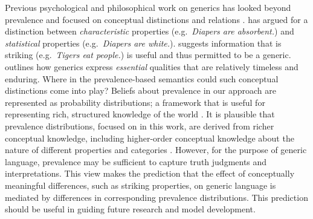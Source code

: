 \documentclass[10pt,letterpaper]{article}
\begin{document}
Previous psychological and philosophical work on generics has looked beyond prevalence and focused on conceptual distinctions and relations \cite{Gelman2005, Prasada2013, Leslie2007, Leslie2008}. 
\citeauthor{Prasada2013} has argued for a distinction between \emph{characteristic} properties (e.g.~\emph{Diapers are absorbent.}) and \emph{statistical} properties (e.g.~\emph{Diapers are white.}).
\citeauthor{Leslie2007} suggests information that is striking (e.g.~\emph{Tigers eat people.}) is useful and thus permitted to be a generic.
\citeauthor{Gelman2005} outlines how generics express \emph{essential} qualities that are relatively timeless and enduring. %
Where in the prevalence-based semantics could such conceptual distinctions come into play?
Beliefs about prevalence in our approach are represented as probability distributions; a framework that is useful for representing rich, structured knowledge of the world \cite{Goodmanconcepts}. 
It is plausible that prevalence distributions, focused on in this work, are derived from richer conceptual knowledge, including higher-order conceptual knowledge about the nature of different properties and categories \cite{Gelman2005, Keil1992}. 
However, for the purpose of generic language, prevalence may be sufficient to capture truth judgments and interpretations.
This view makes the prediction that the effect of conceptually meaningful differences, such as striking properties, on generic language is mediated by differences in corresponding prevalence distributions.
This prediction should be useful in guiding future research and model development.

\end{document}
